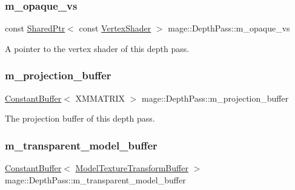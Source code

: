 \subsubsection{\texorpdfstring{m\+\_\+opaque\+\_\+vs}{m\_opaque\_vs}}
{\footnotesize\ttfamily const \hyperlink{namespacemage_a1e01ae66713838a7a67d30e44c67703e}{Shared\+Ptr}$<$ const \hyperlink{classmage_1_1_vertex_shader}{Vertex\+Shader} $>$ mage\+::\+Depth\+Pass\+::m\+\_\+opaque\+\_\+vs\hspace{0.3cm}{\ttfamily [private]}}

A pointer to the vertex shader of this depth pass. \hypertarget{classmage_1_1_depth_pass_a4c9833ceaf223b73404edab4cf81b7c1}{}\label{classmage_1_1_depth_pass_a4c9833ceaf223b73404edab4cf81b7c1} 
\subsubsection{\texorpdfstring{m\+\_\+projection\+\_\+buffer}{m\_projection\_buffer}}
{\footnotesize\ttfamily \hyperlink{structmage_1_1_constant_buffer}{Constant\+Buffer}$<$ X\+M\+M\+A\+T\+R\+IX $>$ mage\+::\+Depth\+Pass\+::m\+\_\+projection\+\_\+buffer\hspace{0.3cm}{\ttfamily [private]}}

The projection buffer of this depth pass. \hypertarget{classmage_1_1_depth_pass_a4b6a38c56e02b6185c1eef8bcaaa5786}{}\label{classmage_1_1_depth_pass_a4b6a38c56e02b6185c1eef8bcaaa5786} 
\subsubsection{\texorpdfstring{m\+\_\+transparent\+\_\+model\+\_\+buffer}{m\_transparent\_model\_buffer}}
{\footnotesize\ttfamily \hyperlink{structmage_1_1_constant_buffer}{Constant\+Buffer}$<$ \hyperlink{structmage_1_1_model_texture_transform_buffer}{Model\+Texture\+Transform\+Buffer} $>$ mage\+::\+Depth\+Pass\+::m\+\_\+transparent\+\_\+model\+\_\+buffer\hspace{0.3cm}{\ttfamily [private]}}

